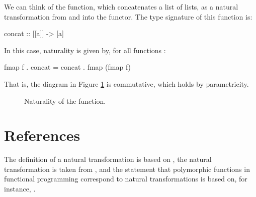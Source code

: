 \begin{example}
  \label{ex:natural-concat-haskell}

  We can think of the  function, which
  concatenates a list of lists, as a natural transformation from and
  into the \texthaskell{[]} functor. The type signature of this
  function is:
  \begin{codehaskell}
concat :: [[a]] -> [a]
  \end{codehaskell}
  In this case, naturality is given by, for all functions
  :
  \begin{codehaskell}
fmap f . concat = concat . fmap (fmap f)
  \end{codehaskell}
  That is, the diagram in Figure \ref{fig:naturality-concat-haskell}
  is commutative, which holds by parametricity.

  \begin{figure}[htb]
    \begin{center}
    \end{center}
    \caption{Naturality of the  function.}
    \label{fig:naturality-concat-haskell}
  \end{figure}

\end{example}

\section{References}
\label{sec:naturals-references}

The definition of a natural transformation is based on
\parencites[16]{maclane-1998}[435--436]{poigne-1992}, the \nat{\eta}
natural transformation is taken from \parencite[11]{marquis-2013}, and
the statement that polymorphic functions in functional programming
correspond to natural transformations is based on, for instance,
\parencites[34]{bird-demoor-1997}[78]{elkins-2009}[435,
  436]{poigne-1992}[48,
  49]{rydeheard-1986}[113]{rydeheard-burstall-1988}[350]{wadler-1989}.

\clearemptydoublepage
